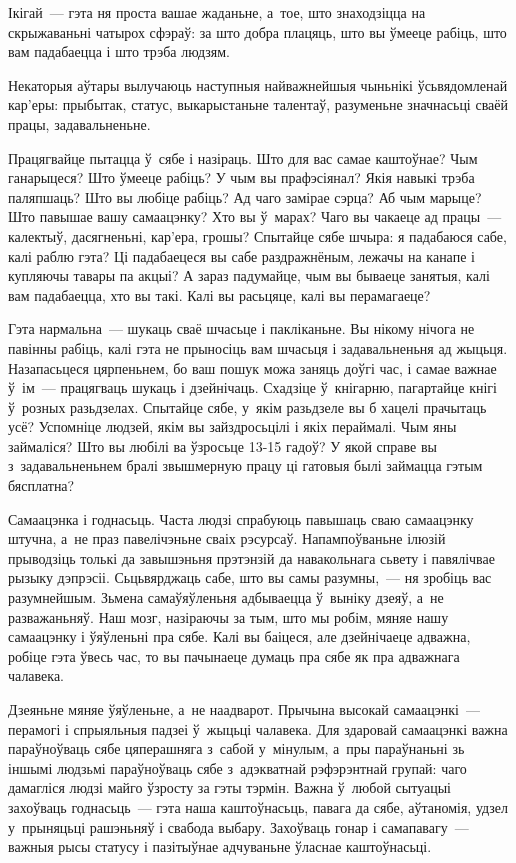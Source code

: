 Ікігай~--- гэта ня проста вашае жаданьне, а~тое, што знаходзіцца на скрыжаваньні чатырох сфэраў: за што добра плацяць, што вы ўмееце рабіць, што вам падабаецца і што трэба людзям.

Некаторыя аўтары вылучаюць наступныя найважнейшыя чыньнікі ўсьвядомленай кар'еры: прыбытак, статус, выкарыстаньне талентаў, разуменьне значнасьці сваёй працы, задавальненьне.

Працягвайце пытацца ў~сябе і назіраць. Што для вас самае каштоўнае? Чым ганарыцеся? Што ўмееце рабіць? У чым вы прафэсіянал? Якія навыкі трэба паляпшаць? Што вы любіце рабіць? Ад чаго замірае сэрца? Аб чым марыце? Што павышае вашу самаацэнку? Хто вы ў~марах? Чаго вы чакаеце ад працы~--- калектыў, дасягненьні, кар'ера, грошы? Спытайце сябе шчыра: я падабаюся сабе, калі раблю гэта? Ці падабаецеся вы сабе раздражнёным, лежачы на канапе і купляючы тавары па акцыі? А зараз падумайце, чым вы бываеце занятыя, калі вам падабаецца, хто вы такі. Калі вы расьцяце, калі вы перамагаеце?

Гэта нармальна~--- шукаць сваё шчасьце і пакліканьне. Вы нікому нічога не павінны рабіць, калі гэта не прыносіць вам шчасьця і задавальненьня ад жыцьця. Назапасьцеся цярпеньнем, бо ваш пошук можа заняць доўгі час, і самае важнае ў~ім~--- працягваць шукаць і дзейнічаць. Схадзіце ў~кнігарню, пагартайце кнігі ў~розных разьдзелах. Спытайце сябе, у~якім разьдзеле вы б хацелі прачытаць усё? Успомніце людзей, якім вы зайздросьцілі і якіх пераймалі. Чым яны займаліся? Што вы любілі ва ўзросьце 13-15 гадоў? У якой справе вы з~задавальненьнем бралі звышмерную працу ці гатовыя былі займацца гэтым бясплатна?

Самаацэнка і годнасьць. Часта людзі спрабуюць павышаць сваю самаацэнку штучна, а~не праз павелічэньне сваіх рэсурсаў. Напампоўваньне ілюзій прыводзіць толькі да завышэньня прэтэнзій да навакольнага сьвету і павялічвае рызыку дэпрэсіі. Сьцьвярджаць сабе, што вы самы разумны,~--- ня зробіць вас разумнейшым. Зьмена самаўяўленьня адбываецца ў~выніку дзеяў, а~не разважаньняў. Наш мозг, назіраючы за тым, што мы робім, мяняе нашу самаацэнку і ўяўленьні пра сябе. Калі вы баіцеся, але дзейнічаеце адважна, робіце гэта ўвесь час, то вы пачынаеце думаць пра сябе як пра адважнага чалавека.

Дзеяньне мяняе ўяўленьне, а~не наадварот. Прычына высокай самаацэнкі~--- перамогі і спрыяльныя падзеі ў~жыцьці чалавека. Для здаровай самаацэнкі важна параўноўваць сябе цяперашняга з~сабой у~мінулым, а~пры параўнаньні зь іншымі людзьмі параўноўваць сябе з~адэкватнай рэфэрэнтнай групай: чаго дамагліся людзі майго ўзросту за гэты тэрмін. Важна ў~любой сытуацыі захоўваць годнасьць~--- гэта наша каштоўнасьць, павага да сябе, аўтаномія, удзел у~прыняцьці рашэньняў і свабода выбару. Захоўваць гонар і самапавагу~--- важныя рысы статусу і пазітыўнае адчуваньне ўласнае каштоўнасьці.

